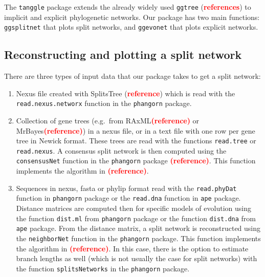 \documentclass[]{IEEEtran}
\providecommand{\tightlist}{%
  \setlength{\itemsep}{0pt}\setlength{\parskip}{0pt}}
\begin{document}
The \texttt{tanggle} package extends the already widely used
\texttt{ggtree} (\textcolor{red}{\textbf{references}}) to implicit and
explicit phylogenetic networks. Our package has two main functions:
\texttt{ggsplitnet} that plots split networks, and \texttt{ggevonet}
that plots explicit networks.

\vspace{-0.25cm}

\hypertarget{reconstructing-and-plotting-a-split-network}{%
\subsection{Reconstructing and plotting a split
network}\label{reconstructing-and-plotting-a-split-network}}

There are three types of input data that our package takes to get a
split network:

\begin{enumerate}
\def\labelenumi{\arabic{enumi}.}
\tightlist
\item
  Nexus file created with SplitsTree
  (\textcolor{red}{\textbf{reference}}) which is read with the
  \texttt{read.nexus.networx} function in the \texttt{phangorn} package.
\item
  Collection of gene trees (e.g.~from
  RAxML\textcolor{red}{\textbf{(reference)}} or
  MrBayes\textcolor{red}{\textbf{(reference)}}) in a nexus file, or in a
  text file with one row per gene tree in Newick format. These trees are
  read with the functions \texttt{read.tree} or \texttt{read.nexus}. A
  consensus split network is then computed using the
  \texttt{consensusNet} function in the \texttt{phangorn} package
  \textcolor{red}{\textbf{(reference)}}. This function implements the
  algorithm in \textcolor{red}{\textbf{(reference)}}.
\item
  Sequences in nexus, fasta or phylip format read with the
  \texttt{read.phyDat} function in \texttt{phangorn} package or the
  \texttt{read.dna} function in \texttt{ape} package. Distance matrices
  are computed then for specific models of evolution using the function
  \texttt{dist.ml} from \texttt{phangorn} package or the function
  \texttt{dist.dna} from \texttt{ape} package. From the distance matrix,
  a split network is reconstructed using the \texttt{neighborNet}
  function in the \texttt{phangorn} package. This function implements
  the algorithm in \textcolor{red}{\textbf{(reference)}}. In this case,
  there is the option to estimate branch lengths as well (which is not
  usually the case for split networks) with the function
  \texttt{splitsNetworks} in the \texttt{phangorn} package.
\end{enumerate}
\end{document}
